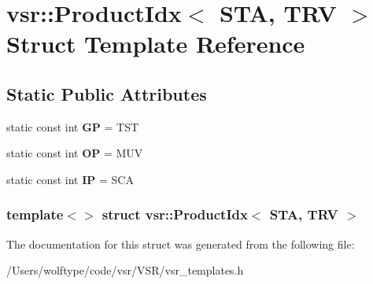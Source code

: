 \hypertarget{structvsr_1_1_product_idx_3_01_s_t_a_00_01_t_r_v_01_4}{\section{vsr\-:\-:Product\-Idx$<$ S\-T\-A, T\-R\-V $>$ Struct Template Reference}
\label{structvsr_1_1_product_idx_3_01_s_t_a_00_01_t_r_v_01_4}
}
\subsection*{Static Public Attributes}
\begin{DoxyCompactItemize}
\item 
\hypertarget{structvsr_1_1_product_idx_3_01_s_t_a_00_01_t_r_v_01_4_af4de0c4e6eb809bff0844e127d28bb4d}{static const int {\bfseries G\-P} = T\-S\-T}\label{structvsr_1_1_product_idx_3_01_s_t_a_00_01_t_r_v_01_4_af4de0c4e6eb809bff0844e127d28bb4d}

\item 
\hypertarget{structvsr_1_1_product_idx_3_01_s_t_a_00_01_t_r_v_01_4_a5e6daafb57598654fd70855eca663115}{static const int {\bfseries O\-P} = M\-U\-V}\label{structvsr_1_1_product_idx_3_01_s_t_a_00_01_t_r_v_01_4_a5e6daafb57598654fd70855eca663115}

\item 
\hypertarget{structvsr_1_1_product_idx_3_01_s_t_a_00_01_t_r_v_01_4_ab4fbf33298da2e581b5e2a41a29be5bf}{static const int {\bfseries I\-P} = S\-C\-A}\label{structvsr_1_1_product_idx_3_01_s_t_a_00_01_t_r_v_01_4_ab4fbf33298da2e581b5e2a41a29be5bf}

\end{DoxyCompactItemize}
\subsubsection*{template$<$$>$ struct vsr\-::\-Product\-Idx$<$ S\-T\-A, T\-R\-V $>$}



The documentation for this struct was generated from the following file\-:\begin{DoxyCompactItemize}
\item 
/\-Users/wolftype/code/vsr/\-V\-S\-R/vsr\-\_\-templates.\-h\end{DoxyCompactItemize}
